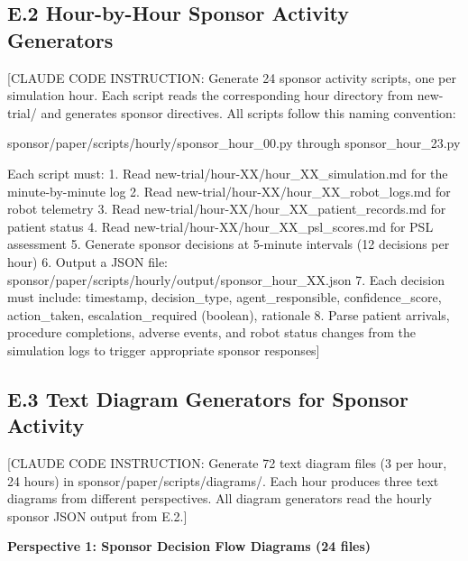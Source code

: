 \subsection*{E.2 Hour-by-Hour Sponsor Activity Generators}

[CLAUDE CODE INSTRUCTION: Generate 24 sponsor activity scripts, one per simulation hour.
Each script reads the corresponding hour directory from new-trial/ and generates sponsor
directives. All scripts follow this naming convention:

  sponsor/paper/scripts/hourly/sponsor\_hour\_00.py through sponsor\_hour\_23.py

Each script must:
1. Read new-trial/hour-XX/hour\_XX\_simulation.md for the minute-by-minute log
2. Read new-trial/hour-XX/hour\_XX\_robot\_logs.md for robot telemetry
3. Read new-trial/hour-XX/hour\_XX\_patient\_records.md for patient status
4. Read new-trial/hour-XX/hour\_XX\_psl\_scores.md for PSL assessment
5. Generate sponsor decisions at 5-minute intervals (12 decisions per hour)
6. Output a JSON file: sponsor/paper/scripts/hourly/output/sponsor\_hour\_XX.json
7. Each decision must include: timestamp, decision\_type, agent\_responsible,
   confidence\_score, action\_taken, escalation\_required (boolean), rationale
8. Parse patient arrivals, procedure completions, adverse events, and robot status
   changes from the simulation logs to trigger appropriate sponsor responses]

\subsection*{E.3 Text Diagram Generators for Sponsor Activity}

[CLAUDE CODE INSTRUCTION: Generate 72 text diagram files (3 per hour, 24 hours) in
sponsor/paper/scripts/diagrams/. Each hour produces three text diagrams from different
perspectives. All diagram generators read the hourly sponsor JSON output from E.2.]

\textbf{Perspective 1: Sponsor Decision Flow Diagrams (24 files)}

